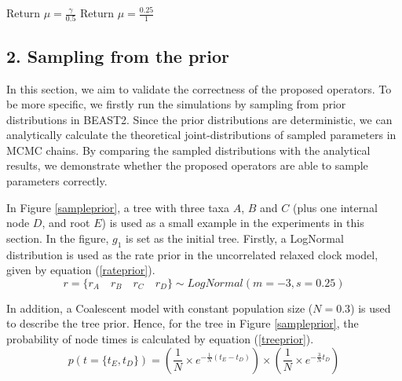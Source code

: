 \documentclass{bmcart}
\begin{document}
\begin{backmatter}
\begin{algorithm}
\begin{algorithmic}
\STATE Return $\mu = \frac{\gamma }{{0.5}}$
\ENDIF
{}
\STATE Return $\mu = \frac{{0.25}}{1}$
\ENDIF

\end{algorithmic}
\end{algorithm}

\subsection*{2. Sampling from the prior}

In this section, we aim to validate the correctness of the proposed operators. To be more specific, we firstly run the simulations by sampling from prior distributions in BEAST2. Since the prior distributions are deterministic, we can analytically calculate the theoretical joint-distributions of sampled parameters in MCMC chains. By comparing the sampled distributions with the analytical results, we demonstrate whether the proposed operators are able to sample parameters correctly.

In Figure \ref{sampleprior}, a tree with three taxa $A$, $B$ and $C$ (plus one internal node $D$, and root $E$) is used as a small example in the experiments in this section. In the figure, $g_1$ is set as the initial tree. Firstly, a LogNormal distribution is used as the rate prior in the uncorrelated relaxed clock model, given by equation (\ref{rateprior}).
\begin{equation}\label{rateprior}
r = \{{r_A}\quad{r_B}\quad{r_C}\quad{r_D}\} \sim LogNormal(m = -3, s = 0.25)
\end{equation}

In addition, a Coalescent model \cite{pybus2002genie} with constant population size ($N=0.3$) is used to describe the tree prior. Hence, for the tree in Figure \ref{sampleprior}, the probability of node times is calculated by equation (\ref{treeprior}).
\begin{equation}\label{treeprior}
p(t=\{{t_E},{t_D}\}) = (\frac{1}{N} \times {e^{ - \frac{1}{N}({t_E} - {t_D})}}) \times (\frac{1}{N} \times {e^{ - \frac{3}{N}{t_D}}})
\end{equation}


\end{backmatter}
\end{document}

